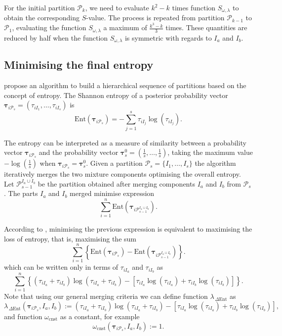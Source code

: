 \documentclass[submit]{smj}
\theoremstyle{definition}
\newcommand{\m}[1]{\boldsymbol{#1}}
\begin{document}
For the initial partition $\mathcal{P}_k$, we need to evaluate $k^2-k$ times function $S_{\omega, \lambda}$ to obtain  the corresponding $S$-value. The process is repeated from partition $\mathcal{P}_{k-1}$ to $\mathcal{P}_1$, evaluating the function $S_{\omega, \lambda}$ a maximum of $\frac{k^3-k}{3}$ times. These quantities are reduced by half when the function $S_{\omega, \lambda}$  is symmetric with regards to $I_a$ and $I_b$. 

\subsection{Minimising the final entropy}
\label{entropy_section}

\cite{baudry2010combining} propose an algorithm to build a hierarchical sequence of partitions based on the concept of entropy. The Shannon entropy of a posterior probability vector $\m\tau_{i \mathcal{P}_s} = \left( \tau_{i I_1} , \dots, \tau_{i I_s}  \right)$ is
\[
\text{Ent}( \m\tau_{i \mathcal{P}_s} ) = -\sum_{j=1}^s \tau_{i I_j}  \log(\tau_{i I_j} ).
\]

The entropy can be interpreted as a measure of similarity between a probability vector $\m\tau_{i \mathcal{P}_s}$ and the probability vector $\m\tau^0_{s}=\left(\frac{1}{s}, \dots, \frac{1}{s}\right)$, taking the maximum value $-\log(\frac{1}{s})$ when $\m\tau_{i \mathcal{P}_s}=\m\tau^0_{s}$. Given a partition $\mathcal{P}_s = \{ I_1, \dots, I_s\}$ the algorithm iteratively merges  the two mixture components optimising the overall entropy. Let $\mathcal{P}_{s-1}^{I_a\cup I_b}$ be the partition obtained after merging components $I_a$ and $I_b$ from $\mathcal{P}_s$. The parts $I_a$ and $I_b$ merged minimise expression
\[
\sum_{i=1}^n \text{Ent}( \m\tau_{i \mathcal{P}_{s-1}^{I_a\cup I_b}} ).
\]

According to \cite{baudry2010combining}, minimising the previous expression is equivalent to maximising the loss of entropy, that is, maximising the sum
\[
\sum_{i=1}^n  \left\{ \text{Ent}( \m\tau_{i \mathcal{P}_s} ) - \text{Ent}( \m\tau_{i \mathcal{P}_{s-1}^{I_a\cup I_b}} ) \right\}.
\]
which can be written only in terms of $\tau_{i I_a}$  and $\tau_{i I_b}$ as
\begin{equation}\label{entropy}
\sum_{i=1}^n   \left\{(\tau_{iI_a}+\tau_{iI_b}) \log(\tau_{iI_a} + \tau_{iI_b}) - \left[\tau_{iI_a} \log(\tau_{iI_a}) + \tau_{iI_b} \log(\tau_{iI_b})\right] \right\}.
\end{equation}
Note that using our general merging criteria we can define function $\lambda_{\,\Delta\text{Ent}}$ as
\[
\lambda_{\,\Delta\text{Ent}}(\m\tau_{i \mathcal{P}_s},  I_a,  I_b) :=  (\tau_{iI_a}+\tau_{iI_b}) \log(\tau_{iI_a} + \tau_{iI_b}) - \left[ \tau_{iI_a} \log(\tau_{iI_a}) + \tau_{iI_b} \log(\tau_{iI_b}) \right],
\]
and function $\omega_{\text{cnst}}$ as a constant, for example 
\[
\omega_{\text{cnst}}(\m\tau_{i \mathcal{P}_s},  I_a,  I_b) := 1.
\]
\end{document}
